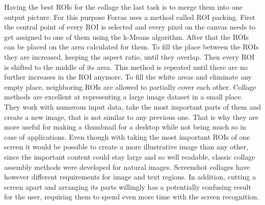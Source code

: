 \documentclass[draft,final]{vutinfth} %
\begin{document}
Having the best ROIs for the collage the last task is to merge them into one output picture.
For this purpose Forras uses a method called ROI packing.
First the central point of every ROI is selected and every pixel on the canvas needs to get assigned to one of them using the k-Means algorithm.
After that the ROIs can be placed on the area calculated for them.
To fill the place between the ROIs they are increased, keeping the aspect ratio, until they overlap. 
Then every ROI is shifted to the middle of its area.
This method is repeated until there are no further increases in the ROI anymore.
To fill the white areas and eliminate any empty place, neighboring ROIs are allowed to partially cover each other.
Collage methods are excellent at representing a large image dataset in a small place.
They work with numerous input data, take the most important parts of them and create a new image, that is not similar to any previous one.
That is why they are more useful for making a thumbnail for a desktop while not being much so in case of applications.
Even though with taking the most important ROIs of one screen it would be possible to create a  more illustrative image than any other, since the important content could stay large and so well readable, classic collage assembly methods were developed for natural images.
Screenshot collages have however different requirements for image and text regions.
In addition, cutting a screen apart and arranging its parts willingly has a potentially confusing result for the user, requiring them to spend even more time with the screen recognition.
\end{document}
